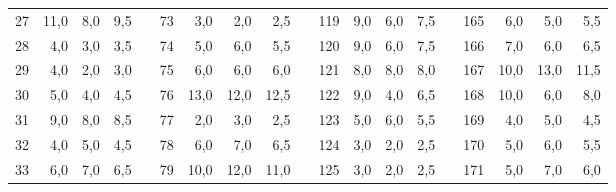 \begin{table}[H]
{\begin{tabular}{|r|r|r|r|l|r|r|r|r|l|r|r|r|r|lrrrr}
27                               & 11,0                         & 8,0                          & 9,5                          &  & 73 & 3,0  & 2,0  & 2,5  &  & 119 & 9,0  & 6,0  & 7,5  & \multicolumn{1}{l|}{} & \multicolumn{1}{r|}{165} & \multicolumn{1}{r|}{6,0}  & \multicolumn{1}{r|}{5,0}  & \multicolumn{1}{r|}{5,5}  \\ \cline{1-4} \cline{6-9} \cline{11-14} \cline{16-19} 
28                               & 4,0                          & 3,0                          & 3,5                          &  & 74 & 5,0  & 6,0  & 5,5  &  & 120 & 9,0  & 6,0  & 7,5  & \multicolumn{1}{l|}{} & \multicolumn{1}{r|}{166} & \multicolumn{1}{r|}{7,0}  & \multicolumn{1}{r|}{6,0}  & \multicolumn{1}{r|}{6,5}  \\ \cline{1-4} \cline{6-9} \cline{11-14} \cline{16-19} 
29                               & 4,0                          & 2,0                          & 3,0                          &  & 75 & 6,0  & 6,0  & 6,0  &  & 121 & 8,0  & 8,0  & 8,0  & \multicolumn{1}{l|}{} & \multicolumn{1}{r|}{167} & \multicolumn{1}{r|}{10,0} & \multicolumn{1}{r|}{13,0} & \multicolumn{1}{r|}{11,5} \\ \cline{1-4} \cline{6-9} \cline{11-14} \cline{16-19} 
30                               & 5,0                          & 4,0                          & 4,5                          &  & 76 & 13,0 & 12,0 & 12,5 &  & 122 & 9,0  & 4,0  & 6,5  & \multicolumn{1}{l|}{} & \multicolumn{1}{r|}{168} & \multicolumn{1}{r|}{10,0} & \multicolumn{1}{r|}{6,0}  & \multicolumn{1}{r|}{8,0}  \\ \cline{1-4} \cline{6-9} \cline{11-14} \cline{16-19} 
31                               & 9,0                          & 8,0                          & 8,5                          &  & 77 & 2,0  & 3,0  & 2,5  &  & 123 & 5,0  & 6,0  & 5,5  & \multicolumn{1}{l|}{} & \multicolumn{1}{r|}{169} & \multicolumn{1}{r|}{4,0}  & \multicolumn{1}{r|}{5,0}  & \multicolumn{1}{r|}{4,5}  \\ \cline{1-4} \cline{6-9} \cline{11-14} \cline{16-19} 
32                               & 4,0                          & 5,0                          & 4,5                          &  & 78 & 6,0  & 7,0  & 6,5  &  & 124 & 3,0  & 2,0  & 2,5  & \multicolumn{1}{l|}{} & \multicolumn{1}{r|}{170} & \multicolumn{1}{r|}{5,0}  & \multicolumn{1}{r|}{6,0}  & \multicolumn{1}{r|}{5,5}  \\ \cline{1-4} \cline{6-9} \cline{11-14} \cline{16-19} 
33                               & 6,0                          & 7,0                          & 6,5                          &  & 79 & 10,0 & 12,0 & 11,0 &  & 125 & 3,0  & 2,0  & 2,5  & \multicolumn{1}{l|}{} & \multicolumn{1}{r|}{171} & \multicolumn{1}{r|}{5,0}  & \multicolumn{1}{r|}{7,0}  & \multicolumn{1}{r|}{6,0}  \\ \cline{1-4} \cline{6-9} \cline{11-14} \cline{16-19} 

\end{tabular}}
\end{table}
